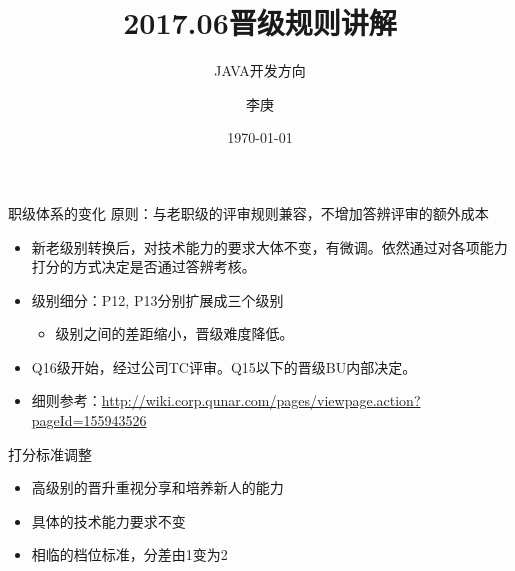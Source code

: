 \documentclass{beamer}
\begin{document}
\begin{CJK}{UTF8}{gbsn}

\title{2017.06晋级规则讲解}

\subtitle{JAVA开发方向}

\author{李庚}


\date{\today}

\begin{frame}
  \titlepage
\end{frame}

\begin{frame}{职级体系的变化}
  原则：与老职级的评审规则兼容，不增加答辨评审的额外成本
  \begin{itemize}
  \item {
    新老级别转换后，对技术能力的要求大体不变，有微调。依然通过对各项能力打分的方式决定是否通过答辨考核。
  }
  \item {
    级别细分：P12, P13分别扩展成三个级别
    \begin{itemize}
      \item { 级别之间的差距缩小，晋级难度降低。}
    \end{itemize}
  }
  \item { Q16级开始，经过公司TC评审。Q15以下的晋级BU内部决定。}
  \item { 细则参考：\url{http://wiki.corp.qunar.com/pages/viewpage.action?pageId=155943526}}
  \end{itemize}

\end{frame}

\begin{frame}{打分标准调整}
  \begin{itemize}
  \item 高级别的晋升重视分享和培养新人的能力
  \item 具体的技术能力要求不变
  \item 相临的档位标准，分差由1变为2
  \end{itemize}
  
\end{frame}


\end{CJK}
\end{document}
